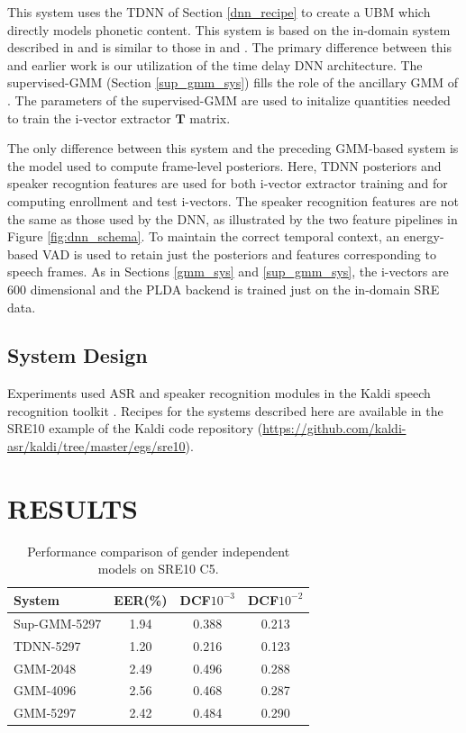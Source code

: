 \documentclass{article}
\begin{document}
This system 
uses the TDNN of Section \ref{dnn_recipe} 
to create a UBM which directly models phonetic content.
This system is based on the in-domain system described in 
\cite{garcia2014} and is similar to
those in \cite{lei2014} and \cite{kenny2014deep}.
The primary difference between this and earlier work
is our utilization of the time delay DNN architecture.
The supervised-GMM (Section \ref{sup_gmm_sys}) fills the role
of the ancillary GMM of \cite{garcia2014}.
The parameters of the supervised-GMM 
are used to initalize quantities needed to train the
i-vector extractor $\boldsymbol{T}$ matrix. 

 
The only difference between this system and the preceding
GMM-based system is the model used to compute frame-level posteriors.
Here, TDNN posteriors and speaker recogntion features are used for both
i-vector extractor training and for computing enrollment and
test i-vectors.
The speaker recognition features are not the same as those used
by the DNN, as illustrated by the two 
feature pipelines in Figure \ref{fig:dnn_schema}.
 To maintain the correct temporal context,
an energy-based VAD is used to retain
just the posteriors and features corresponding to speech frames.
As in Sections \ref{gmm_sys} and \ref{sup_gmm_sys},
the i-vectors are 600 dimensional and the PLDA
backend is trained just on the in-domain SRE data.

\subsection{System Design}
Experiments used ASR and speaker recognition modules in the
Kaldi speech recognition toolkit \cite{kaldi}. Recipes for
the systems described here are available in the SRE10
example of the Kaldi code repository (\url{https://github.com/kaldi-asr/kaldi/tree/master/egs/sre10}).

\section{RESULTS}
\begin{table}
\begin{center}
\begin{tabular}{l|ccc}
\hline
System & EER(\%) & DCF$10^{-3}$ & DCF$10^{-2}$ \\ \hline \hline
Sup-GMM-5297 & 1.94 & 0.388 & 0.213 \\
TDNN-5297 & 1.20 & 0.216 & 0.123 \\
GMM-2048 & 2.49 & 0.496 & 0.288 \\
GMM-4096 & 2.56 & 0.468 & 0.287 \\
GMM-5297 & 2.42 & 0.484 & 0.290 \\ \hline
\end{tabular}
\end{center}
\caption{Performance comparison of gender independent models on SRE10 C5.}
\label{gender_ind}
\end{table}
\end{document}
